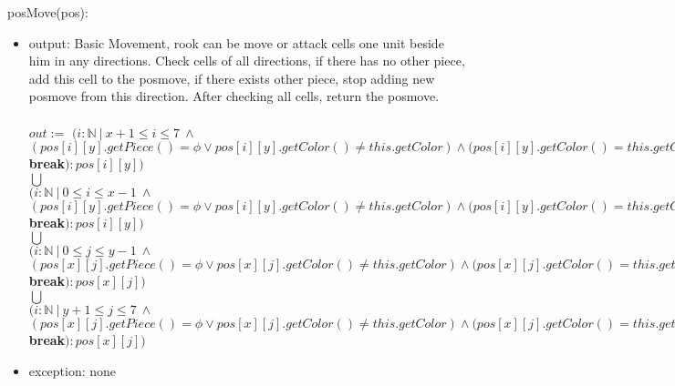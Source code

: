\documentclass[12pt]{article}
\begin{document}
\noindent posMove(pos):
\begin{itemize}
\item output:  Basic Movement, rook can be move or attack cells one unit beside him in any directions. Check cells of all directions, if there has no other piece, add this cell to the posmove, if there exists other piece, stop adding new posmove from this direction. After checking all cells, return the posmove.\\
\\
$out :=$
$(i : \mathbb{N} \ | \ x + 1 \leq i \leq 7 \  \wedge$ \\
$ (pos[i][y].getPiece() = \phi \vee pos[i][y].getColor() \ne this.getColor) \wedge (pos[i][y].getColor() = this.getColor() \Rightarrow$ \textbf{break}$) : pos[i][y])$\\
$\bigcup$ \\
$(i : \mathbb{N} \ | \ 0 \leq i \leq x - 1 \ \wedge $ \\ 
$(pos[i][y].getPiece() = \phi \vee pos[i][y].getColor() \ne this.getColor) \wedge (pos[i][y].getColor() = this.getColor() \Rightarrow$ \textbf{break}$) : pos[i][y])$\\
$\bigcup$ \\
$(i : \mathbb{N} \ | \ 0 \leq j \leq y - 1 \ \wedge $ \\ 
$(pos[x][j].getPiece() = \phi \vee pos[x][j].getColor() \ne this.getColor) \wedge (pos[x][j].getColor() = this.getColor() \Rightarrow$ \textbf{break}$) : pos[x][j])$\\
$\bigcup$ \\
$(i : \mathbb{N} \ | \ y + 1 \leq j \leq 7 \ \wedge $ \\ 
$(pos[x][j].getPiece() = \phi \vee pos[x][j].getColor() \ne this.getColor) \wedge (pos[x][j].getColor() = this.getColor() \Rightarrow$ \textbf{break}$) : pos[x][j])$
\item exception: none
\end{itemize}

\newpage
\end{document}
